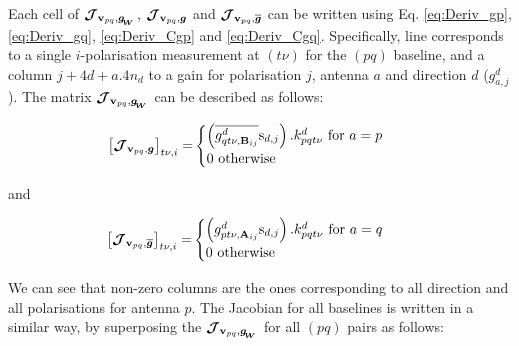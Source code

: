 





Each cell of
$\bm{\mathcal{J}}_{{\textbf{v}_{pq}},\bm{g_{\!_{W}}}}$, $\bm{\mathcal{J}}_{{\textbf{v}_{pq}},\bm{g}}$ and $\bm{\mathcal{J}}_{{\textbf{v}_{pq}},\bm{\overline{g}}}$ can be written using Eq. \ref{eq:Deriv_gp}, \ref{eq:Deriv_gq},
\ref{eq:Deriv_Cgp} and \ref{eq:Deriv_Cgq}. Specifically, line corresponds to a
single $i$-polarisation measurement at $(t\nu)$ for the $(pq)$ baseline, and a column
$j+4d+a.4n_d$ to a gain for polarisation $j$, antenna $a$ and
direction $d$ ($g^{d}_{a,j}$). The matrix $\bm{\mathcal{J}}_{{\textbf{v}_{pq}},\bm{g_{\!_{W}}}}$ can be described as follows:




\begin{alignat}{2}
\label{eq:Jpq0}
\left[\bm{\mathcal{J}}_{{\textbf{v}_{pq}},\bm{g}}\right]_{t\nu,i}=&
\begin{cases}
\left(\overline{g^{d}_{qt\nu,\textbf{B}_{ij}}}\text{s}_{d,j}\right).k^{d}_{pqt\nu}\text{ for }a=p\\
0\ \text{otherwise}
\end{cases}
\end{alignat}

\noindent and

\begin{alignat}{2}
\label{eq:Jpq1}
\left[\bm{\mathcal{J}}_{{\textbf{v}_{pq}},\bm{\overline{g}}}\right]_{t\nu,i}=&
\begin{cases}
\left(g^{d}_{pt\nu,\textbf{A}_{ij}}\text{s}_{d,j}\right).k^{d}_{pqt\nu}\text{ for }a=q\\
0\ \text{otherwise}
\end{cases}
\end{alignat}

\noindent We can see that non-zero columns are the ones
corresponding to all direction and all polarisations for antenna $p$. The Jacobian for all
baselines is written in a similar way, by superposing the
$\bm{\mathcal{J}}_{{\textbf{v}_{pq}},\bm{g_{\!_{W}}}}$ for all $(pq)$ pairs as follows:


